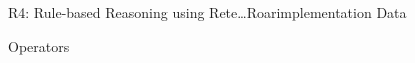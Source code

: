 \begin{nestedsection}{R4: Rule-based Reasoning using Rete\dots Roar}{implementation}
	Data

	Operators

\end{nestedsection}